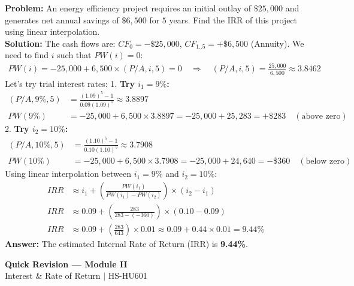\documentclass[12pt,a4paper]{article}
\begin{document}
\begin{tcolorbox}[examplebox, title={Example 3: Internal Rate of Return (IRR)}]
\textbf{Problem:} An energy efficiency project requires an initial outlay of $\$25,000$ and generates net annual savings of $\$6,500$ for $5$ years. Find the IRR of this project using linear interpolation.\\[4pt]
\textbf{Solution:}
The cash flows are: $CF_0 = -\$25,000$, $CF_{1..5} = +\$6,500$ (Annuity).
We need to find $i$ such that $PW(i) = 0$:
\begin{align*}
  PW(i) = -25,000 + 6,500 \times (P/A, i, 5) = 0 \quad \Rightarrow \quad (P/A, i, 5) = \frac{25,000}{6,500} \approx 3.8462
\end{align*}
Let's try trial interest rates:
1.  \textbf{Try $i_1 = 9\%$:}
    \begin{align*}
      (P/A, 9\%, 5) &= \frac{(1.09)^5 - 1}{0.09(1.09)^5} \approx 3.8897 \\
      PW(9\%) &= -25,000 + 6,500 \times 3.8897 = -25,000 + 25,283 = +\$283 \quad (\text{above zero})
    \end{align*}
2.  \textbf{Try $i_2 = 10\%$:}
    \begin{align*}
      (P/A, 10\%, 5) &= \frac{(1.10)^5 - 1}{0.10(1.10)^5} \approx 3.7908 \\
      PW(10\%) &= -25,000 + 6,500 \times 3.7908 = -25,000 + 24,640 = -\$360 \quad (\text{below zero})
    \end{align*}
Using linear interpolation between $i_1 = 9\%$ and $i_2 = 10\%$:
\begin{align*}
  IRR &\approx i_1 + \left( \frac{PW(i_1)}{PW(i_1) - PW(i_2)} \right) \times (i_2 - i_1) \\
  IRR &\approx 0.09 + \left( \frac{283}{283 - (-360)} \right) \times (0.10 - 0.09) \\
  IRR &\approx 0.09 + \left( \frac{283}{643} \right) \times 0.01 \approx 0.09 + 0.44 \times 0.01 = 9.44\%
\end{align*}
\textbf{Answer:} The estimated Internal Rate of Return (IRR) is \textbf{9.44\%}.
\end{tcolorbox}

\newpage
\begin{center}
  {\large\bfseries\color{myred} Quick Revision --- Module II}\\[3pt]
  {\small\color{mydark} Interest \& Rate of Return $|$ HS-HU601}
\end{center}
\noindent{\color{myred}\rule{\linewidth}{1.2pt}}
\vspace{4pt}
\end{document}
